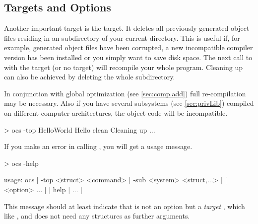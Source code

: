 \subsection{Targets and Options}

Another important target is the  target. It deletes all
previously generated object files residing in 
an  subdirectory of your current directory. This is useful if,
for example, generated  
object files have been corrupted, a new incompatible compiler
version has been installed or you simply want to save disk space.
The next call to  with the  target (or no target) will
recompile your whole program. Cleaning up can also be achieved by deleting
the whole  subdirectory.

In conjunction with global optimization 
(see \ref{sec:comp.add}) full re-compilation may be necessary. Also if
you have several subsystems (see \ref{sec:privLib}) compiled on
different computer architectures, the object code will be incompatible.

\begin{prog}
> ocs -top HelloWorld Hello clean
Cleaning up ...
\end{prog}

If you make an error in calling , you will get a usage message.

\begin{prog}
> ocs -help

usage: ocs [ -top <struct> <command> | -sub <system> <struct,...> ]
           [ <option> ... ]
           [ help | ... ]
\end{prog}
This message should at least indicate that  is not an option but
a \emph{target} , which like ,  and 
does not need any 
\opal{} structures as further arguments.



